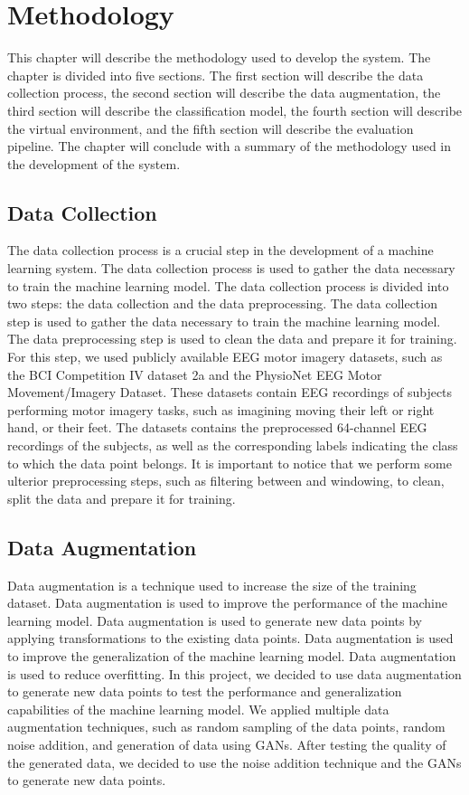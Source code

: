 \chapter{Methodology}\label{ch:methodology}
This chapter will describe the methodology used to develop the system.
The chapter is divided into five sections.
The first section will describe the data collection process, the second section will describe the data augmentation, the third section will describe the classification model, the fourth section will describe the virtual environment, and the fifth section will describe the evaluation pipeline.
The chapter will conclude with a summary of the methodology used in the development of the system.

\section{Data Collection}
The data collection process is a crucial step in the development of a machine learning system.
The data collection process is used to gather the data necessary to train the machine learning model.
The data collection process is divided into two steps: the data collection and the data preprocessing.
The data collection step is used to gather the data necessary to train the machine learning model.
The data preprocessing step is used to clean the data and prepare it for training.
For this step, we used publicly available EEG motor imagery datasets, such as the BCI Competition IV dataset 2a and the PhysioNet EEG Motor Movement/Imagery Dataset.
These datasets contain EEG recordings of subjects performing motor imagery tasks, such as imagining moving their left or right hand, or their feet.
The datasets contains the preprocessed 64-channel EEG recordings of the subjects, as well as the corresponding labels indicating the class to which the data point belongs.
It is important to notice that we perform some ulterior preprocessing steps, such as filtering between and windowing, to clean, split the data and prepare it for training.

\section{Data Augmentation}
Data augmentation is a technique used to increase the size of the training dataset.
Data augmentation is used to improve the performance of the machine learning model.
Data augmentation is used to generate new data points by applying transformations to the existing data points.
Data augmentation is used to improve the generalization of the machine learning model.
Data augmentation is used to reduce overfitting.
In this project, we decided to use data augmentation to generate new data points to test the performance and generalization capabilities of the machine learning model.
We applied multiple data augmentation techniques, such as random sampling of the data points, random noise addition, and generation of data using GANs.
After testing the quality of the generated data, we decided to use the noise addition technique and the GANs to generate new data points.

